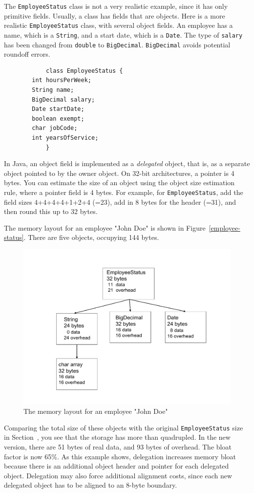 \documentclass{book}
\theoremstyle{definition}
\begin{document}
The \texttt{EmployeeStatus} class is not a very realistic example, since it has only primitive fields. Usually, a class has fields that are objects. Here is a more realistic \texttt{EmployeeStatus} class, with several object fields. An employee has a name, which is a \texttt{String}, and a start date, which is a \texttt{Date}. The type of \texttt{salary} has been changed from \texttt{double} to \texttt{BigDecimal}. \texttt{BigDecimal} avoids potential roundoff errors.
\ttfamily
\begin{verbatim} 
			class EmployeeStatus {
        int hoursPerWeek;
        String name;
        BigDecimal salary;
        Date startDate;
        boolean exempt;
        char jobCode;
        int yearsOfService;
			}
\end{verbatim}
\normalfont
 
In Java, an object field is implemented as a \textit{delegated} object, that is, as a separate object pointed to by the owner object. On 32-bit architectures, a pointer is 4 bytes. You can estimate the size of an object using the object size estimation rule, where a pointer field is 4 bytes. For example, for \texttt{EmployeeStatus}, add the field sizes 4+4+4+4+1+2+4 (=23), add in 8 bytes for the header (=31), and then round this up to 32 bytes. 

The memory layout for an employee "John Doe" is shown in Figure~\ref{employee-status}. There are five objects, occupying 144 bytes.
 \begin{figure}
  \centering
 \includegraphics[width=.60\textwidth]{Figures/chapter4/employee-status.pdf}
  \caption{The memory layout for an employee "John Doe"}
  \label{fig:employee-status}
\end{figure}

Comparing the total size of these objects with the original \texttt{EmployeeStatus} size in Section~\cite{CostOfObects}, you see that the storage has more than quadrupled. In the new version, there are 51 bytes of real data, and 93 bytes of overhead. The bloat factor is now 65\%. As this example shows, delegation increases memory bloat because there is an additional object header and pointer for each delegated object. Delegation may also force additional alignment costs, since each new delegated object has to be aligned to an 8-byte boundary. 
\end{document}
